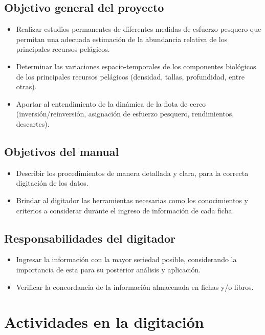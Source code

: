\documentclass[a4paper,oneside,11pt]{book}
\begin{document}
\section{Objetivo general del proyecto}

\begin{itemize}
\item Realizar estudios permanentes de diferentes medidas de esfuerzo pesquero que permitan una adecuada estimación de la abundancia relativa de los principales recursos pelágicos.
\item Determinar las variaciones espacio-temporales de los componentes biológicos de los principales recursos pelágicos (densidad, tallas, profundidad, entre otras).
\item Aportar al entendimiento de la dinámica de la flota de cerco (inversión/reinversión, asignación de esfuerzo pesquero, rendimientos, descartes).

\end{itemize}


\section{Objetivos del manual}

 \begin{itemize}
 \item Describir los procedimientos de manera detallada y clara, para la correcta digitación de los datos.
 \item Brindar al digitador las herramientas necesarias como los conocimientos y criterios a considerar durante el ingreso de información de cada ficha.
 \end{itemize}


\section{Responsabilidades del digitador}

\begin{itemize}
\item Ingresar la información con la mayor seriedad posible, considerando la importancia de esta para su posterior análisis y aplicación.
\item Verificar la concordancia de la información almacenada en fichas y/o libros.


\end{itemize}

\chapter{Actividades en la digitación}
\end{document}
